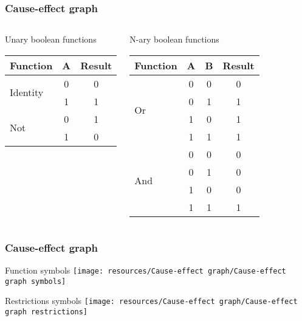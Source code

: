 \begin{frame}
\frametitle{Cause-effect graph}


\begin{columns}[t]
\begin{block:fact}{Unary boolean functions}
\begin{tabular}{l|c|c}
\textbf{Function}			& \textbf{A}	& \textbf{Result}\\\hline\hline
\multirow{2}{*}{Identity} 	& 0 			& 0\\
							& 1 			& 1\\\hline\hline
\multirow{2}{*}{Not}		& 0 			& 1\\
							& 1				& 0\\
\end{tabular}
\end{block:fact}

\qquad
{}
\begin{block:fact}{N-ary boolean functions}
\begin{tabular}{l|c|c|c}
\textbf{Function}			& \textbf{A}	& \textbf{B}	& \textbf{Result}\\\hline\hline
\multirow{4}{*}{Or} 		& 0 			& 0				& 0\\
							& 0 			& 1				& 1\\
							& 1 			& 0				& 1\\
							& 1 			& 1				& 1\\\hline\hline
\multirow{4}{*}{And}		& 0 			& 0				& 0\\
							& 0 			& 1				& 0\\
							& 1 			& 0				& 0\\
							& 1 			& 1				& 1\\
\end{tabular}
\end{block:fact}
\end{columns}

\end{frame}



\begin{frame}
\frametitle{Cause-effect graph}

\begin{block}{Function symbols}
\texttt{[image: resources/Cause-effect graph/Cause-effect graph symbols]}
\end{block}

\begin{block}{Restrictions symbols}
\texttt{[image: resources/Cause-effect graph/Cause-effect graph restrictions]}
\end{block}

\end{frame}





